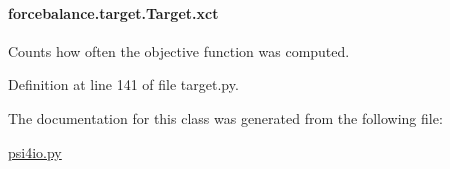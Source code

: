 \hypertarget{classforcebalance_1_1target_1_1Target_aad2e385cfbf7b4a68f1c2cb41133fe82}{
\paragraph[{xct}]{\setlength{\rightskip}{0pt plus 5cm}forcebalance.\-target.\-Target.\-xct\hspace{0.3cm}{\ttfamily [inherited]}}}\label{classforcebalance_1_1target_1_1Target_aad2e385cfbf7b4a68f1c2cb41133fe82}


Counts how often the objective function was computed. 



Definition at line 141 of file target.\-py.



The documentation for this class was generated from the following file\-:\begin{DoxyCompactItemize}
\item 
\hyperlink{psi4io_8py}{psi4io.\-py}\end{DoxyCompactItemize}
